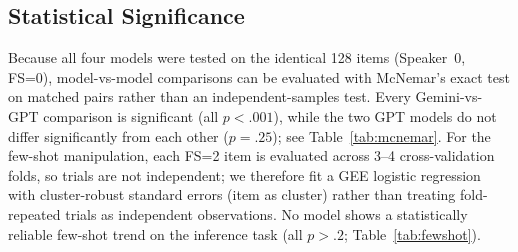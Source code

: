 %


\subsection{Statistical Significance}
\label{sec:stats}

Because all four models were tested on the identical 128 items (Speaker~0,
FS=0), model-vs-model comparisons can be evaluated with McNemar's exact test
on matched pairs rather than an independent-samples test. Every
Gemini-vs-GPT comparison is significant (all $p<.001$), while the two GPT
models do not differ significantly from each other ($p=.25$); see
Table~\ref{tab:mcnemar}. For the few-shot manipulation, each FS=2 item is
evaluated across 3--4 cross-validation folds, so trials are not independent;
we therefore fit a GEE logistic regression with cluster-robust standard
errors (item as cluster) rather than treating fold-repeated trials as
independent observations. No model shows a statistically reliable few-shot
trend on the inference task (all $p>.2$; Table~\ref{tab:fewshot}).


